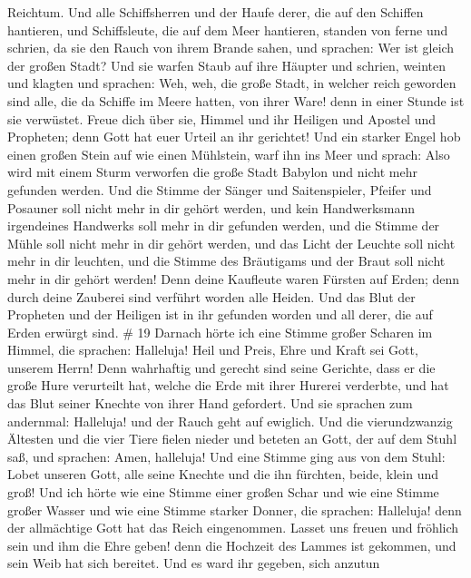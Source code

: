 Reichtum. Und alle Schiffsherren und der Haufe derer, die auf den
Schiffen hantieren, und Schiffsleute, die auf dem Meer hantieren,
standen von ferne  und schrien, da sie den Rauch von ihrem
Brande sahen, und sprachen: Wer ist gleich der großen Stadt?
 Und sie warfen Staub auf ihre Häupter und schrien, weinten
und klagten und sprachen: Weh, weh, die große Stadt, in welcher reich
geworden sind alle, die da Schiffe im Meere hatten, von ihrer Ware! denn
in einer Stunde ist sie verwüstet.  Freue dich über sie,
Himmel und ihr Heiligen und Apostel und Propheten; denn Gott hat euer
Urteil an ihr gerichtet!  Und ein starker Engel hob einen
großen Stein auf wie einen Mühlstein, warf ihn ins Meer und sprach: Also
wird mit einem Sturm verworfen die große Stadt Babylon und nicht mehr
gefunden werden.  Und die Stimme der Sänger und
Saitenspieler, Pfeifer und Posauner soll nicht mehr in dir gehört
werden, und kein Handwerksmann irgendeines Handwerks soll mehr in dir
gefunden werden, und die Stimme der Mühle soll nicht mehr in dir gehört
werden,  und das Licht der Leuchte soll nicht mehr in dir
leuchten, und die Stimme des Bräutigams und der Braut soll nicht mehr in
dir gehört werden! Denn deine Kaufleute waren Fürsten auf Erden; denn
durch deine Zauberei sind verführt worden alle Heiden.  Und
das Blut der Propheten und der Heiligen ist in ihr gefunden worden und
all derer, die auf Erden erwürgt sind. \# 19  Darnach hörte
ich eine Stimme großer Scharen im Himmel, die sprachen: Halleluja! Heil
und Preis, Ehre und Kraft sei Gott, unserem Herrn!  Denn
wahrhaftig und gerecht sind seine Gerichte, dass er die große Hure
verurteilt hat, welche die Erde mit ihrer Hurerei verderbte, und hat das
Blut seiner Knechte von ihrer Hand gefordert.  Und sie
sprachen zum andernmal: Halleluja! und der Rauch geht auf ewiglich.
 Und die vierundzwanzig Ältesten und die vier Tiere fielen
nieder und beteten an Gott, der auf dem Stuhl saß, und sprachen: Amen,
halleluja!  Und eine Stimme ging aus von dem Stuhl: Lobet
unseren Gott, alle seine Knechte und die ihn fürchten, beide, klein und
groß!  Und ich hörte wie eine Stimme einer großen Schar und
wie eine Stimme großer Wasser und wie eine Stimme starker Donner, die
sprachen: Halleluja! denn der allmächtige Gott hat das Reich
eingenommen.  Lasset uns freuen und fröhlich sein und ihm
die Ehre geben! denn die Hochzeit des Lammes ist gekommen, und sein Weib
hat sich bereitet.  Und es ward ihr gegeben, sich anzutun
